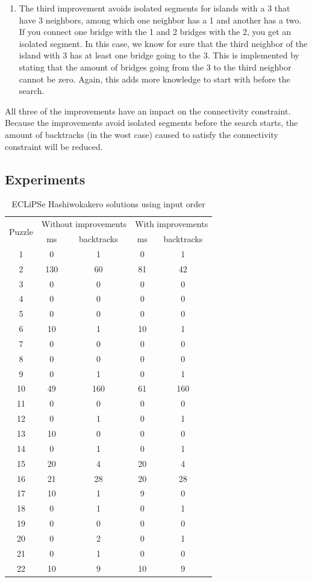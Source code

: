 \documentclass{report}
\begin{document}
\begin{enumerate}
	\item The third improvement avoids isolated segments for islands with a 3 that have 3 neighbors, among which one neighbor has a 1 and another has a two. If you connect one bridge with the 1 and 2 bridges with the 2, you get an isolated segment. In this case, we know for sure that the third neighbor of the island with 3 has at least one bridge going to the 3. This is implemented by stating that the amount of bridges going from the 3 to the third neighbor cannot be zero. Again, this adds more knowledge to start with before the search.
\end{enumerate}

All three of the improvements have an impact on the connectivity constraint. Because the improvements avoid isolated segments before the search starts, the amount of backtracks (in the wost case) caused to satisfy the connectivity constraint will be reduced.

\subsection{Experiments}

\begin{table}[h!]
  \begin{tabular}{|c|c|c|c|c|}
    \hline
    \multirow{2}{*}{Puzzle} &
    \multicolumn{2}{L|}{Without improvements} &
    \multicolumn{2}{L|}{With improvements}\\
      & ms & backtracks & ms & backtracks \\
    \hline
    1 & 0 & 1 & 0 & 1 \\
    2 & 130 & 60 & 81 & 42 \\
    3 & 0 & 0 & 0 & 0 \\
    4 & 0 & 0 & 0 & 0 \\
    5 & 0 & 0 & 0 & 0 \\
    6 & 10 & 1 & 10 & 1 \\
    7 & 0 & 0 & 0 & 0 \\
    8 & 0 & 0 & 0 & 0 \\
    9 & 0 & 1 & 0 & 1 \\
    10 & 49 & 160 & 61 & 160 \\
    11 & 0 & 0 & 0 & 0 \\
    12 & 0 & 1 & 0 & 1 \\
    13 & 10 & 0 & 0 & 0 \\
    14 & 0 & 1 & 0 & 1 \\
    15 & 20 & 4 & 20 & 4 \\
    16 & 21 & 28 & 20 & 28 \\
    17 & 10 & 1 & 9 & 0 \\
    18 & 0 & 1 & 0 & 1 \\
    19 & 0 & 0 & 0 & 0 \\
    20 & 0 & 2 & 0 & 1 \\
    21 & 0 & 1 & 0 & 0 \\
    22 & 10 & 9 & 10 & 9 \\
    \hline
  \end{tabular}
  \caption{ECLiPSe Hashiwokakero solutions using input order}
\end{table}
\end{document}
